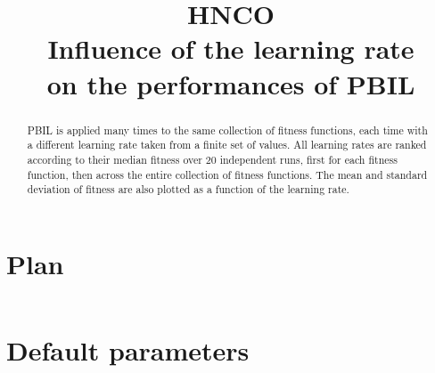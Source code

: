 \documentclass[a4paper]{article}
\begin{document}

\title{HNCO\\
  Influence of the learning rate\\
  on the performances of PBIL}
\maketitle

\begin{abstract}
  PBIL is applied many times to the same collection of fitness
  functions, each time with a different learning rate taken from a
  finite set of values. All learning rates are ranked according to
  their median fitness over 20 independent runs, first for each
  fitness function, then across the entire collection of fitness
  functions. The mean and standard deviation of fitness are also
  plotted as a function of the learning rate.
\end{abstract}

\tableofcontents

\newpage

\section{Plan}

\inputminted[breaklines=true]{json}{../plan-compact.json}



\section{Default parameters}

\inputminted[breaklines=true]{text}{../log.default}
\end{document}

